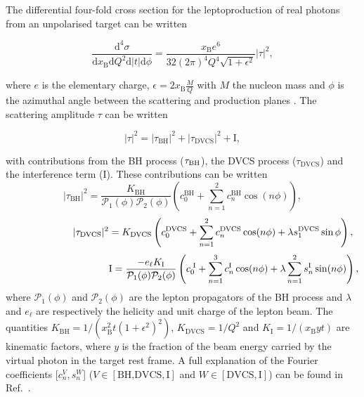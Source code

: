 The differential four-fold cross section for the leptoproduction of real photons
from an unpolarised target can be written \cite{Bel02b}
\begin{center}
\begin{equation}
\frac{\textrm{d}^4\sigma}{\textrm{d}x_{\textrm{B}}\textrm{d}Q^{2}\textrm{d}
|t|\textrm{d}\phi} =
\frac{x_{\textrm{B}}e^{6}}{32(2\pi)^{4} Q^{4}\sqrt{1+\epsilon^{2}}}
|\tau|^{2},
\end{equation}
\end{center}
where $e$ is the elementary
charge, $\epsilon=2x_\textrm{B}\frac{M}{Q}$ with $M$
the nucleon mass and $\phi$ is the
azimuthal angle between the scattering and production planes \cite{Tre04}.
The scattering amplitude $\tau$ can be written
\begin{center}
\begin{equation}
|\tau|^{2} = |\tau_{\textrm{BH}}|^{2} +
|\tau_{\textrm{DVCS}}|^{2} + \textrm{I},
\end{equation}
\end{center}
with contributions from the \textrm{BH} process ($\tau_{\textrm{\textrm{BH}}}$),
the DVCS process
($\tau_{\textrm{DVCS}}$) and the interference term (I). These
contributions can be written 
\begin{equation}
 |\tau_{\textrm{BH}}|^{2} =
\frac{K_{\textrm{BH}}}{\mathcal{P}_{1}(\phi)\mathcal{P}_{2}(\phi)}
\left(c_{0}^{
\textrm{BH}} + \sum_{n=1}^2 c_{n}^{\textrm{BH}}\cos(n\phi)\right),
\label{e:tbh}
\end{equation}
\begin{equation}
 \hspace{2.2cm}|\tau_{\textrm{DVCS}}|^{2} =
K_{\textrm{DVCS}}\left(c_{0}^{\textrm{DVCS}} +
\sum_{n=1}^2
c_{n}^{\textrm{DVCS}}\cos(n\phi) + \lambda
s_{1}^{\textrm{DVCS}}\sin\phi\right),
\label{e:tdvcs}
\end{equation}
\begin{equation}
\hspace{3.7cm} \textrm{I} = \frac{- e_\ell
K_{\textrm{I}}}{\mathcal{P}_{1}(\phi)\mathcal{P}_{2}(\phi)}\left(c_{0}^{\textrm{
I}}
+
\sum_{n=1}^3 c_{n}^{\textrm{I}}\cos(n\phi) + \lambda \sum_{n=1}^2
s_{n}^{\textrm{I}}\sin(n\phi)\right),
\label{e:ti}
\end{equation}
where $\mathcal{P}_1(\phi)$ and $\mathcal{P}_2(\phi)$ are the lepton propagators
of the BH process and $\lambda$ and $e_\ell$ are respectively the
helicity and unit charge of the lepton beam.  The
quantities $K_{\textrm{BH}}=1/(x_\textrm{B}^2t(1+\epsilon^2)^2)$,
$K_{\textrm{DVCS}}=1/Q^2$
and $K_{\textrm{I}}=1/(x_{\textrm{B}}yt)$ are kinematic factors, where
$y$ is the fraction of the beam energy carried by the virtual photon in
the target rest frame. A full
explanation of the Fourier coefficients [$c_n^V,s_n^W$]
($V\in[\textrm{BH,DVCS},\textrm{I}]$ and $W\in[\textrm{DVCS},\textrm{I}]$) can be
found in
Ref.~\cite{Bel02b}.
 
